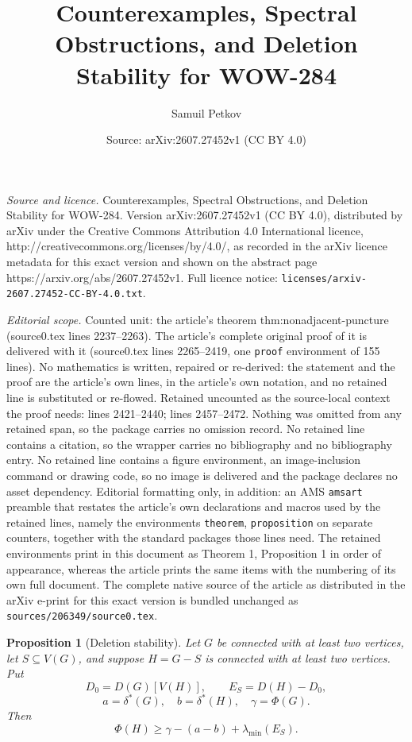 \documentclass[10pt,a4paper]{amsart}
\title{Counterexamples, Spectral Obstructions, and Deletion Stability for WOW-284}
\author{Samuil Petkov}
\date{Source: arXiv:2607.27452v1 (CC BY 4.0)}
\newtheorem{proposition}{Proposition}
\newcommand{\resultbox}[1]{\boxed{#1}}
\begin{document}
\maketitle

\noindent\emph{Source and licence.} Counterexamples, Spectral Obstructions, and Deletion Stability for WOW-284. Version arXiv:2607.27452v1 (CC BY 4.0), distributed by arXiv under the Creative Commons Attribution 4.0 International licence, http://creativecommons.org/licenses/by/4.0/, as recorded in the arXiv licence metadata for this exact version and shown on the abstract page https://arxiv.org/abs/2607.27452v1. Full licence notice: \texttt{licenses/arxiv-2607.27452-CC-BY-4.0.txt}.\par\smallskip

\noindent\textit{Editorial scope.} Counted unit: the article's theorem thm:nonadjacent-puncture (source0.tex lines 2237--2263). The article's complete original proof of it is delivered with it (source0.tex lines 2265--2419, one \texttt{proof} environment of 155 lines). No mathematics is written, repaired or re-derived: the statement and the proof are the article's own lines, in the article's own notation, and no retained line is substituted or re-flowed.  Retained uncounted as the source-local context the proof needs: lines 2421--2440; lines 2457--2472.  Nothing was omitted from any retained span, so the package carries no omission record.  No retained line contains a citation, so the wrapper carries no bibliography and no bibliography entry.  No retained line contains a figure environment, an image-inclusion command or drawing code, so no image is delivered and the package declares no asset dependency.  Editorial formatting only, in addition: an AMS \texttt{amsart} preamble that restates the article's own declarations and macros used by the retained lines, namely the environments \texttt{theorem}, \texttt{proposition} on separate counters, together with the standard packages those lines need.  The retained environments print in this document as Theorem 1, Proposition 1 in order of appearance, whereas the article prints the same items with the numbering of its own full document.  The complete native source of the article as distributed in the arXiv e-print for this exact version is bundled unchanged as \texttt{sources/206349/source0.tex}.
\begin{proposition}[Deletion stability]\label{prop:deletion-stability}
Let \(G\) be connected with at least two vertices, let
\(S\subseteq V(G)\), and suppose \(H=G-S\) is connected with at least two
vertices.  Put
\[
 D_0=D(G)[V(H)],
 \qquad E_S=D(H)-D_0,
\]
\[
 a=\delta^*(G),
 \quad b=\delta^*(H),
 \quad \gamma=\Phi(G).
\]
Then
\[
 \resultbox{
 \Phi(H)\ge\gamma-(a-b)+\lambda_{\min}(E_S).
 }
\]
\end{proposition}
\end{document}

